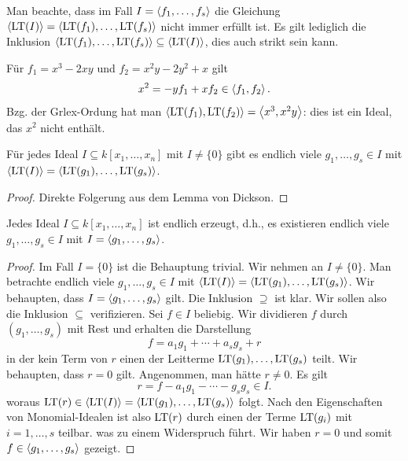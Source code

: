 \documentclass[11pt]{article}
\numberwithin{equation}{section}
\begin{document}
Man beachte, dass im Fall $I = \left< f_1,\ldots,f_s \right>$ die Gleichung $\left< \operatorname{LT}(I) \right> = \left<  \operatorname{LT}(f_1),\ldots, \operatorname{LT}(f_s) \right>$ nicht immer erfüllt ist. Es gilt lediglich die Inklusion $\left<  \operatorname{LT}(f_1),\ldots, \operatorname{LT}(f_s) \right> \subseteq \left< \operatorname{LT}(I) \right>$, dies auch strikt sein kann. 

\begin{beispiel} 
	Für $f_1 = x^3  - 2 x y$ und $f_2 = x^2 y - 2 y^2 + x$ gilt 
	\[
		x^2 = - y f_1 + x f_2 \in \left< f_1,f_2 \right>.
	\]
	Bzg. der Grlex-Ordung hat man $\left< \operatorname{LT}(f_1), \operatorname{LT}(f_2) \right> = \left< x^3, x^2 y  \right>$: dies ist ein Ideal, das $x^2$ nicht enthält. 
	
\end{beispiel} 

\begin{proposition} 
	Für jedes Ideal $I \subseteq k[x_1,\ldots,x_n]$ mit $I \ne \{0\}$ gibt es endlich viele $g_1,\ldots,g_s \in I$ mit $\left< \operatorname{LT}(I) \right> = \left<  \operatorname{LT}(g_1),\ldots,\operatorname{LT}(g_s)  \right>$. 
\end{proposition} 
\begin{proof} 
	Direkte Folgerung aus dem Lemma von Dickson. 
\end{proof} 

\begin{theorem}
	Jedes Ideal $I \subseteq k[x_1,\ldots,x_n]$ ist endlich erzeugt, d.h., es existieren endlich viele $g_1,\ldots,g_s \in I$ mit $I = \left< g_1,\ldots,g_s \right>$. 
\end{theorem} 
\begin{proof} 
	Im Fall $I=\{0\}$ ist die Behauptung trivial. Wir nehmen an $I \ne \{0\}$. Man betrachte endlich viele $g_1,\ldots,g_s \in I$ mit $\left< \operatorname{LT}(I) \right> = \left<  \operatorname{LT}(g_1),\ldots, \operatorname{LT}(g_s) \right>$. Wir behaupten, dass $I = \left< g_1,\ldots,g_s \right>$ gilt. 
	Die Inklusion $\supseteq$ ist klar. Wir sollen also die Inklusion $\subseteq$ verifizieren. Sei $f \in I$ beliebig. Wir dividieren $f$ durch $(g_1,\ldots,g_s)$ mit Rest und erhalten die Darstellung 
	\[
		f = a_1 g_1 + \cdots + a_s g_s + r
	\]
	in der kein Term von $r$ einen der Leitterme $\operatorname{LT}(g_1),\ldots, \operatorname{LT}(g_s)$ teilt. Wir behaupten, dass $r=0$ gilt. Angenommen, man hätte $r \ne 0$.
	Es gilt 
	\[
		r = f - a_1 g_1 - \cdots - g_s g_s \in I.
	\]
		woraus $\operatorname{LT}(r) \in \left< \operatorname{LT}(I) \right> = \left< \operatorname{LT}(g_1),\ldots,\operatorname{LT}(g_s) \right>$ folgt. Nach den Eigenschaften von Monomial-Idealen ist also $\operatorname{LT}(r)$ durch einen der Terme $\operatorname{LT}(g_i)$ mit $i =1,\ldots,s$ teilbar. was zu einem Widerspruch führt. Wir haben $r=0$ und somit $f \in \left< g_1,\ldots,g_s \right>$ gezeigt. 
\end{proof} 
\end{document}
